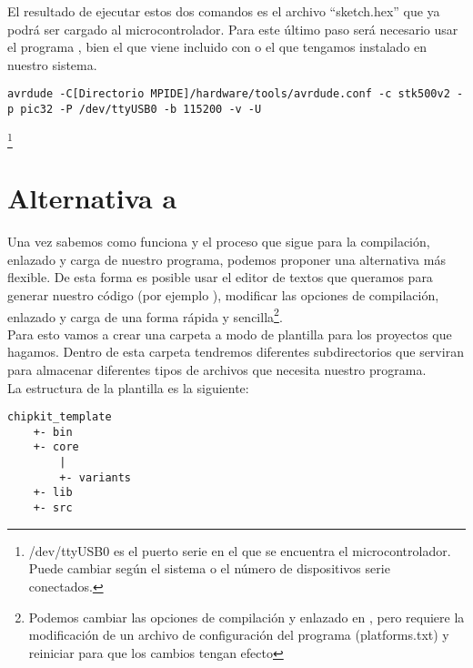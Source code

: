 El resultado de ejecutar estos dos comandos es el archivo ``sketch.hex'' que ya podrá ser cargado al microcontrolador.
Para este último paso será necesario usar el programa , bien el que viene incluido con  o el que tengamos instalado en nuestro sistema.
\begin{lstlisting}[breaklines=true]
avrdude -C[Directorio MPIDE]/hardware/tools/avrdude.conf -c stk500v2 -p pic32 -P /dev/ttyUSB0 -b 115200 -v -U
\end{lstlisting}\footnote{/dev/ttyUSB0 es el puerto serie en el que se encuentra el microcontrolador. Puede cambiar según el sistema o el número de dispositivos serie conectados.}

\newpage

\section{Alternativa a }

Una vez sabemos como funciona  y el proceso que sigue para la compilación, enlazado y carga de nuestro programa, podemos proponer una alternativa más flexible.  
De esta forma es posible usar el editor de textos que queramos para generar nuestro código (por ejemplo ), modificar las opciones de compilación, enlazado y carga de una forma rápida y sencilla\footnote{Podemos cambiar las opciones de compilación y enlazado en , pero requiere la modificación de un archivo de configuración del programa (platforms.txt) y reiniciar  para que los cambios tengan efecto}.\\
Para esto vamos a crear una carpeta a modo de plantilla para los proyectos que hagamos. Dentro de esta carpeta tendremos diferentes subdirectorios que serviran para almacenar diferentes tipos de archivos que necesita nuestro programa.\\
La estructura de la plantilla es la siguiente:
\begin{lstlisting}
chipkit_template
	+- bin
	+- core
	    |
	    +- variants
	+- lib
	+- src
\end{lstlisting}

